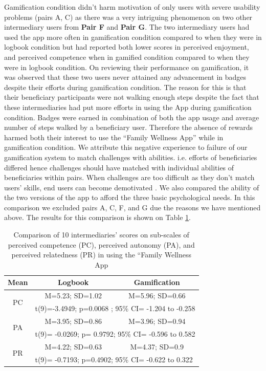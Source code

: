 \documentclass{sig-alternate}
\begin{document}
Gamification condition didn't harm motivation of only users with severe usability problems (pairs A, C) as there was  a very intriguing phenomenon on two other intermediary users from \textbf{Pair F} and \textbf{Pair G}. The two intermediary users had used the app more often in gamification condition  compared to when they were in logbook condition but had reported both lower scores in perceived enjoyment, and perceived competence when in gamified condition compared to when they were in logbook condition. On reviewing their performance on gamification, it was observed that these two users never attained any advancement in badges despite their efforts during gamification condition. The reason for this is that their beneficiary participants were not walking enough steps despite the fact that these intermediaries had put  more efforts in using the App during gamification condition. Badges were earned in combination of both the app usage and average number of steps walked by a beneficiary user. Therefore the absence of rewards harmed both their interest to use the ``Family Wellness App'' while in gamification condition. We attribute this negative experience to failure of our gamification system to match challenges with abilities. i.e. efforts of beneficiaries differed hence challenges should have matched with individual abilities of beneficiaries within pairs. When challenges are too difficult as they don't match users' skills, end users can become demotivated \cite{zhang2008:motivational}.\newline
We also compared the ability of the two versions of the app to afford the three basic psychological needs. In this comparison we excluded pairs A, C, F, and G due the reasons we have mentioned above. The results for this comparison is shown on Table \ref{table:imiwellnessinterm}.
\begin{table}[h!]
  \begin{center}
    \caption{Comparison of 10 intermediaries' scores on sub-scales of perceived competence (PC), perceived autonomy (PA), and perceived relatedness (PR) in using the ``Family Wellness App}
    \label{table:imiwellnessinterm}
	\begin{tabular}{|c|c|c|}
		\hline
		Mean &Logbook&Gamification\\
		\hline
		 \multirow{2}{*}{PC}&M=5.23; SD=1.02&M=5.96; SD=0.66\\\cline{2-3} 

		 &\multicolumn{2}{|l|}{t(9)=-3.4949; p=0.0068 ; 95\% CI= -1.204 to -0.258} \\
\hline
		 \multirow{2}{*}{PA}&M=3.95; SD=0.86&M=3.96; SD=0.94\\\cline{2-3} 

		 &\multicolumn{2}{|l|}{t(9)= -0.0269; p= 0.9792; 95\% CI= -0.596 to 0.582} \\
\hline

		 \multirow{2}{*}{PR}&M=4.22; SD=0.63&M=4.37; SD=0.9\\\cline{2-3} 
		 &\multicolumn{2}{|l|}{t(9)= -0.7193; p=0.4902; 95\% CI= -0.622 to 0.322 } \\
\hline
	\end{tabular}
  \end{center}
\end{table}
\end{document}
